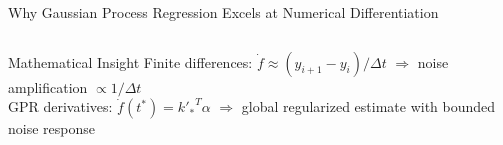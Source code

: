 \documentclass[aspectratio=169]{beamer}
\begin{document}
\begin{frame}{Why Gaussian Process Regression Excels at Numerical Differentiation}
\begin{columns}[t]
  \end{columns}
  
  \vspace{0.8em}
  
  \begin{alertblock}{Mathematical Insight}
    \centering
    \footnotesize
    Finite differences: $\dot{f} \approx (y_{i+1} - y_i)/\Delta t$ $\Rightarrow$ noise amplification $\propto 1/\Delta t$ \\
    GPR derivatives: $\dot{f}(t^*) = {k'_*}^T \alpha$ $\Rightarrow$ global regularized estimate with bounded noise response
  \end{alertblock}
  
\end{frame}

\end{document}
